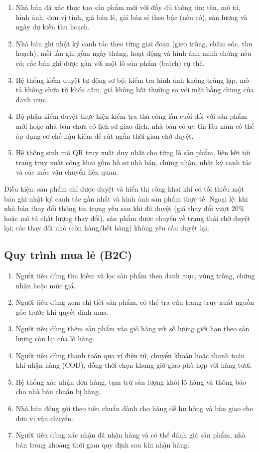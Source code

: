 \begin{enumerate}
    \item Nhà bán đã xác thực tạo sản phẩm mới với đầy đủ thông tin: tên, mô tả, hình ảnh, đơn vị tính, giá bán lẻ, giá bán sỉ theo bậc (nếu có), sản lượng và ngày dự kiến thu hoạch.
    \item Nhà bán ghi nhật ký canh tác theo từng giai đoạn (gieo trồng, chăm sóc, thu hoạch), mỗi lần ghi gồm ngày tháng, hoạt động và hình ảnh minh chứng nếu có; các bản ghi được gắn với một lô sản phẩm (batch) cụ thể.
    \item Hệ thống kiểm duyệt tự động sơ bộ: kiểm tra hình ảnh không trùng lặp, mô tả không chứa từ khóa cấm, giá không bất thường so với mặt bằng chung của danh mục.
    \item Bộ phận kiểm duyệt thực hiện kiểm tra thủ công lần cuối đối với sản phẩm mới hoặc nhà bán chưa có lịch sử giao dịch; nhà bán có uy tín lâu năm có thể áp dụng cơ chế hậu kiểm để rút ngắn thời gian chờ duyệt.
    \item Hệ thống sinh mã QR truy xuất duy nhất cho từng lô sản phẩm, liên kết tới trang truy xuất công khai gồm hồ sơ nhà bán, chứng nhận, nhật ký canh tác và các mốc vận chuyển liên quan.
\end{enumerate}

Điều kiện: sản phẩm chỉ được duyệt và hiển thị công khai khi có tối thiểu một bản ghi nhật ký canh tác gần nhất và hình ảnh sản phẩm thực tế. Ngoại lệ: khi nhà bán thay đổi thông tin trọng yếu sau khi đã duyệt (giá thay đổi vượt 20\% hoặc mô tả chất lượng thay đổi), sản phẩm được chuyển về trạng thái chờ duyệt lại; các thay đổi nhỏ (còn hàng/hết hàng) không yêu cầu duyệt lại.



\subsection{Quy trình mua lẻ (B2C)}

\begin{enumerate}
    \item Người tiêu dùng tìm kiếm và lọc sản phẩm theo danh mục, vùng trồng, chứng nhận hoặc mức giá.
    \item Người tiêu dùng xem chi tiết sản phẩm, có thể tra cứu trang truy xuất nguồn gốc trước khi quyết định mua.
    \item Người tiêu dùng thêm sản phẩm vào giỏ hàng với số lượng giới hạn theo sản lượng còn lại của lô hàng.
    \item Người tiêu dùng thanh toán qua ví điện tử, chuyển khoản hoặc thanh toán khi nhận hàng (COD), đồng thời chọn khung giờ giao phù hợp với hàng tươi.
    \item Hệ thống xác nhận đơn hàng, tạm trừ sản lượng khỏi lô hàng và thông báo cho nhà bán chuẩn bị hàng.
    \item Nhà bán đóng gói theo tiêu chuẩn dành cho hàng dễ hư hỏng và bàn giao cho đơn vị vận chuyển.
    \item Người tiêu dùng xác nhận đã nhận hàng và có thể đánh giá sản phẩm, nhà bán trong khoảng thời gian quy định sau khi nhận hàng.
\end{enumerate}


